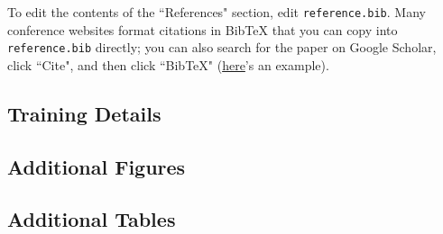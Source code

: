 \documentclass[12pt,letterpaper]{article}
\begin{document}

\makereference

{\color{blue} To edit the contents of the ``References" section, edit \texttt{reference.bib}. Many conference websites format citations in BibTeX that you can copy into \texttt{reference.bib} directly; you can also search for the paper on Google Scholar, click ``Cite", and then click ``BibTeX" (\href{https://scholar.google.com/scholar?hl=en&as_sdt=0%2C23&q=attention+is+all+you+need&btnG=#d=gs_cit&t=1700436667623&u=%2Fscholar%3Fq%3Dinfo%3A5Gohgn6QFikJ%3Ascholar.google.com%2F%26output%3Dcite%26scirp%3D0%26hl%3Den}{here}'s an example).}





\clearpage
\makeappendix

\subsection{Training Details}

\subsection{Additional Figures}

\subsection{Additional Tables}
\end{document}
